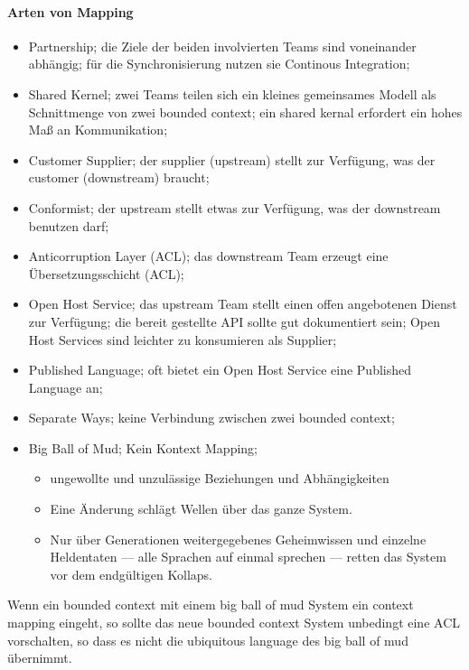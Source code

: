 \documentclass[11pt,a4paper]{scrartcl}
\begin{document}
\paragraph{Arten von Mapping}
\begin{itemize}
	\item Partnership; die Ziele der beiden involvierten Teams sind voneinander abhängig; für die Synchronisierung nutzen sie Continous Integration;
	\item Shared Kernel; zwei Teams teilen sich ein kleines gemeinsames Modell als Schnittmenge von zwei bounded context; ein shared kernal erfordert ein hohes Maß an Kommunikation;
	\item Customer Supplier; der supplier (upstream) stellt zur Verfügung, was der customer (downstream) braucht;
	\item Conformist; der upstream stellt etwas zur Verfügung, was der downstream benutzen darf;
	\item Anticorruption Layer (ACL); das downstream Team erzeugt eine Übersetzungsschicht (ACL);
	\item Open Host Service; das upstream Team stellt einen offen angebotenen Dienst zur Verfügung; die bereit gestellte API sollte gut dokumentiert sein; Open Host Services sind leichter zu konsumieren als Supplier;
	\item Published Language; oft bietet ein Open Host Service eine Published Language an;
	\item Separate Ways; keine Verbindung zwischen zwei bounded context;
	\item Big Ball of Mud; Kein Kontext Mapping;
	\begin{itemize}
		\item ungewollte und unzulässige Beziehungen und Abhängigkeiten
		\item Eine Änderung schlägt Wellen über das ganze System.
		\item Nur über Generationen weitergegebenes Geheimwissen und einzelne Heldentaten --- alle Sprachen auf einmal sprechen --- retten das System vor dem endgültigen Kollaps.
	\end{itemize}
\end{itemize}

Wenn ein bounded context mit einem big ball of mud System ein context mapping eingeht, so sollte das neue bounded context System unbedingt eine ACL vorschalten, so dass es nicht die ubiquitous language des big ball of mud übernimmt.
\end{document}
